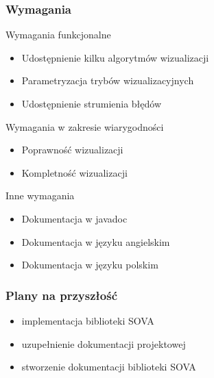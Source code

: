\documentclass[xcolor=dvipsnames,9pt]{beamer}
\begin{document}
\begin{frame}
	\frametitle{Wymagania}

\begin{block}{Wymagania funkcjonalne}
		\begin{itemize}
			\item Udostępnienie kilku algorytmów wizualizacji
			  \item Parametryzacja trybów wizualizacyjnych
			\item Udostępnienie strumienia błędów
	\end{itemize}
	\end{block}

	\begin{block}{Wymagania w zakresie wiarygodności}
		\begin{itemize}
			\item Poprawność wizualizacji
			\item Kompletność wizualizacji
	\end{itemize}
	\end{block}

\begin{block}{Inne wymagania}
		\begin{itemize}
			\item Dokumentacja w javadoc
			  \item Dokumentacja w języku angielskim
			\item Dokumentacja w języku polskim 
	\end{itemize}
	\end{block}

\end{frame}


\begin{frame}
	\frametitle{Plany na przyszłość}
	\begin{block}{}
		\begin{itemize}
			\item  implementacja biblioteki SOVA
			  \item uzupełnienie dokumentacji projektowej
			\item stworzenie dokumentacji biblioteki SOVA
	\end{itemize}
	\end{block}
  



\end{frame}
\end{document}
